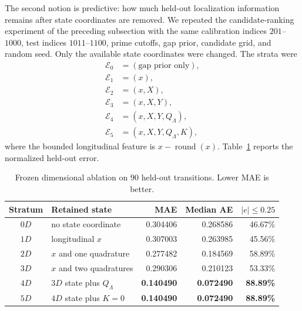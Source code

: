 \documentclass[11pt]{amsart}
\theoremstyle{definition}
\theoremstyle{remark}
\begin{document}
The second notion is predictive: how much held-out localization information remains after state
coordinates are removed.  We repeated the candidate-ranking experiment of the preceding
subsection with the same calibration indices $201$--$1000$, test indices $1011$--$1100$,
prime cutoffs, gap prior, candidate grid, and random seed.  Only the available state coordinates
were changed.  The strata were
\begin{align}
 \mathcal E_0&=(\text{gap prior only}),\\
 \mathcal E_1&=(x),\\
 \mathcal E_2&=(x,X),\\
 \mathcal E_3&=(x,X,Y),\\
 \mathcal E_4&=(x,X,Y,Q_\Lambda),\\
 \mathcal E_5&=(x,X,Y,Q_\Lambda,K),
\end{align}
where the bounded longitudinal feature is $x-\operatorname{round}(x)$.  Table~\ref{tab:ablation}
reports the normalized held-out error.

\begin{table}[t]
\centering
\caption{Frozen dimensional ablation on 90 held-out transitions.  Lower MAE is better.}
\label{tab:ablation}
\begin{tabular}{clrrr}
\toprule
Stratum & Retained state & MAE & Median AE & $|e|\le0.25$\\
\midrule
$0D$ & no state coordinate & 0.304406 & 0.268586 & 46.67\%\\
$1D$ & longitudinal $x$ & 0.307003 & 0.263985 & 45.56\%\\
$2D$ & $x$ and one quadrature & 0.277482 & 0.184569 & 58.89\%\\
$3D$ & $x$ and two quadratures & 0.290306 & 0.210123 & 53.33\%\\
$4D$ & $3D$ state plus $Q_\Lambda$ & \textbf{0.140490} & \textbf{0.072490} & \textbf{88.89\%}\\
$5D$ & $4D$ state plus $K=0$ & \textbf{0.140490} & \textbf{0.072490} & \textbf{88.89\%}\\
\bottomrule
\end{tabular}
\end{table}
\end{document}
